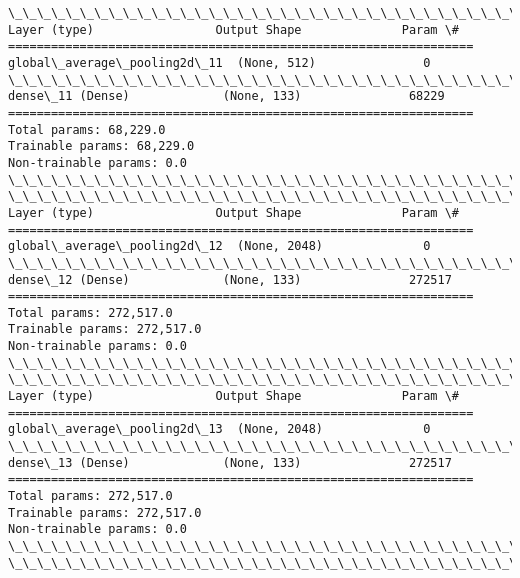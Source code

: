 \documentclass[11pt]{article}
\begin{document}
    \begin{Verbatim}[commandchars=\\\{\}]
\_\_\_\_\_\_\_\_\_\_\_\_\_\_\_\_\_\_\_\_\_\_\_\_\_\_\_\_\_\_\_\_\_\_\_\_\_\_\_\_\_\_\_\_\_\_\_\_\_\_\_\_\_\_\_\_\_\_\_\_\_\_\_\_\_
Layer (type)                 Output Shape              Param \#   
=================================================================
global\_average\_pooling2d\_11  (None, 512)               0         
\_\_\_\_\_\_\_\_\_\_\_\_\_\_\_\_\_\_\_\_\_\_\_\_\_\_\_\_\_\_\_\_\_\_\_\_\_\_\_\_\_\_\_\_\_\_\_\_\_\_\_\_\_\_\_\_\_\_\_\_\_\_\_\_\_
dense\_11 (Dense)             (None, 133)               68229     
=================================================================
Total params: 68,229.0
Trainable params: 68,229.0
Non-trainable params: 0.0
\_\_\_\_\_\_\_\_\_\_\_\_\_\_\_\_\_\_\_\_\_\_\_\_\_\_\_\_\_\_\_\_\_\_\_\_\_\_\_\_\_\_\_\_\_\_\_\_\_\_\_\_\_\_\_\_\_\_\_\_\_\_\_\_\_
\_\_\_\_\_\_\_\_\_\_\_\_\_\_\_\_\_\_\_\_\_\_\_\_\_\_\_\_\_\_\_\_\_\_\_\_\_\_\_\_\_\_\_\_\_\_\_\_\_\_\_\_\_\_\_\_\_\_\_\_\_\_\_\_\_
Layer (type)                 Output Shape              Param \#   
=================================================================
global\_average\_pooling2d\_12  (None, 2048)              0         
\_\_\_\_\_\_\_\_\_\_\_\_\_\_\_\_\_\_\_\_\_\_\_\_\_\_\_\_\_\_\_\_\_\_\_\_\_\_\_\_\_\_\_\_\_\_\_\_\_\_\_\_\_\_\_\_\_\_\_\_\_\_\_\_\_
dense\_12 (Dense)             (None, 133)               272517    
=================================================================
Total params: 272,517.0
Trainable params: 272,517.0
Non-trainable params: 0.0
\_\_\_\_\_\_\_\_\_\_\_\_\_\_\_\_\_\_\_\_\_\_\_\_\_\_\_\_\_\_\_\_\_\_\_\_\_\_\_\_\_\_\_\_\_\_\_\_\_\_\_\_\_\_\_\_\_\_\_\_\_\_\_\_\_
\_\_\_\_\_\_\_\_\_\_\_\_\_\_\_\_\_\_\_\_\_\_\_\_\_\_\_\_\_\_\_\_\_\_\_\_\_\_\_\_\_\_\_\_\_\_\_\_\_\_\_\_\_\_\_\_\_\_\_\_\_\_\_\_\_
Layer (type)                 Output Shape              Param \#   
=================================================================
global\_average\_pooling2d\_13  (None, 2048)              0         
\_\_\_\_\_\_\_\_\_\_\_\_\_\_\_\_\_\_\_\_\_\_\_\_\_\_\_\_\_\_\_\_\_\_\_\_\_\_\_\_\_\_\_\_\_\_\_\_\_\_\_\_\_\_\_\_\_\_\_\_\_\_\_\_\_
dense\_13 (Dense)             (None, 133)               272517    
=================================================================
Total params: 272,517.0
Trainable params: 272,517.0
Non-trainable params: 0.0
\_\_\_\_\_\_\_\_\_\_\_\_\_\_\_\_\_\_\_\_\_\_\_\_\_\_\_\_\_\_\_\_\_\_\_\_\_\_\_\_\_\_\_\_\_\_\_\_\_\_\_\_\_\_\_\_\_\_\_\_\_\_\_\_\_
\_\_\_\_\_\_\_\_\_\_\_\_\_\_\_\_\_\_\_\_\_\_\_\_\_\_\_\_\_\_\_\_\_\_\_\_\_\_\_\_\_\_\_\_\_\_\_\_\_\_\_\_\_\_\_\_\_\_\_\_\_\_\_\_\_

\end{Verbatim}
\end{document}
